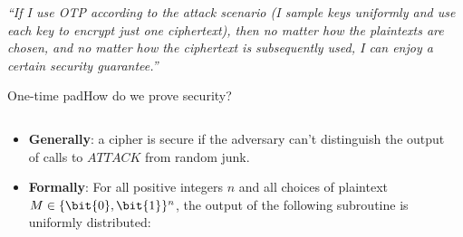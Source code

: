 \documentclass[aspectratio=169, lualatex, handout]{beamer}
\begin{document}
\begin{frame}
	\begin{center}
		\Large\textit{``If I use OTP according to the attack scenario (I sample keys uniformly and use each key to encrypt just one ciphertext), then no matter how the plaintexts are chosen, and no matter how the ciphertext is subsequently used, I can enjoy a certain security guarantee.''}
	\end{center}
\end{frame}

\begin{frame}{One-time pad}{How do we prove security?}
	\begin{columns}[c]
		\begin{column}{0.5\textwidth}
			\begin{itemize}[<+->]
				\item \textbf{Generally}: a cipher is secure if the adversary can't distinguish the output of calls to $ATTACK$ from random junk.
				\item \textbf{Formally}: For all positive integers $n$ and all choices of plaintext $M \in \{\bit{0}, \bit{1}\}^n$, the output of the following subroutine is uniformly distributed:
			\end{itemize}
		\end{column}
		\begin{column}{0.5\textwidth}
		\end{column}
	\end{columns}
\end{frame}
\end{document}
